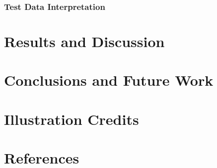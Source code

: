 \documentclass[12pt]{article}
\begin{document}
\subsubsection{Test Data Interpretation}


\section{Results and Discussion}

\section{Conclusions and Future Work}

\section{Illustration Credits}

\section{References}
\end{document}
